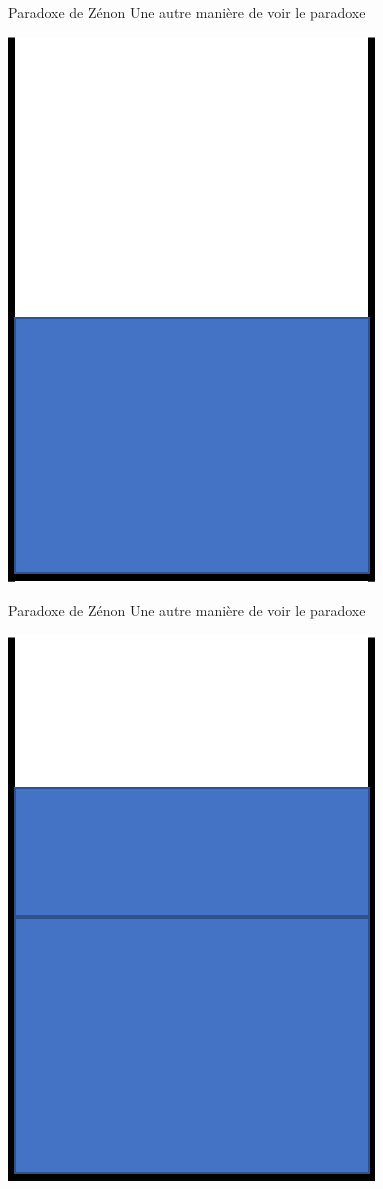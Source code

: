 \documentclass[11pt]{beamer}
\begin{document}
\begin{frame}{Paradoxe de Zénon}
Une autre manière de voir le paradoxe
\begin{center}
	\includegraphics[scale=0.5]{glass1.png}
\end{center}
\end{frame}
\begin{frame}{Paradoxe de Zénon}
Une autre manière de voir le paradoxe
\begin{center}
	\includegraphics[scale=0.5]{glass2.png}
\end{center}
\end{frame}
\end{document}
